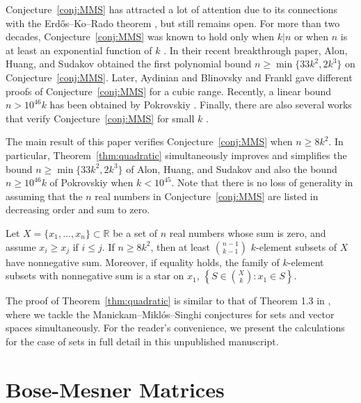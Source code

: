 \documentclass[12pt]{article}
\theoremstyle{plain}
{\theorembodyfont{\slshape}
\newtheorem{theorem}{Theorem}[section]
\newtheorem{lemma}[theorem]{Lemma}
\newtheorem{corollary}[theorem]{Corollary}}
\newcommand\tref[1]{Theorem~\ref{thm:#1}}
\newcommand\conjref[1]{Conjecture~\ref{conj:#1}}
\begin{document}
\conjref{MMS} has attracted a lot of attention due to its connections with the Erd\H{o}s--Ko--Rado theorem \cite{AAH, ahs, aydblin, bhatt, bier, biermanickam, blini, chowdhury, CSS, frankl, HS, HuangSudakov, manickam, mm, ms, MC, Pokrovskiy, Tyomkyn}, but still remains open. For more than two decades, \conjref{MMS} was known to hold only when $k|n$ \cite{ms} or when $n$ is at least an exponential function of $k$ \cite{bhatt, biermanickam, mm, Tyomkyn}. In their recent breakthrough paper, Alon, Huang, and Sudakov \cite{ahs} obtained the first polynomial bound $n \geq \min\{33k^{2}, 2k^{3}\}$ on \conjref{MMS}. Later, Aydinian and Blinovsky \cite{aydblin} and Frankl \cite{frankl} gave different proofs of \conjref{MMS} for a cubic range. Recently, a linear bound $n > 10^{46}k$ has been obtained by Pokrovskiy \cite{Pokrovskiy}. Finally, there are also several works that verify \conjref{MMS} for small $k$ \cite{chowdhury, HS, manickam, MC}.

The main result of this paper verifies \conjref{MMS} when $n \geq 8k^{2}$. In particular, \tref{quadratic} simultaneously improves and simplifies the bound $n \geq \min\{33k^{2}, 2k^{3} \}$ of Alon, Huang, and Sudakov \cite{ahs} and also the bound $n \geq 10^{46}k$ of Pokrovskiy \cite{Pokrovskiy} when $k < 10^{45}$. Note that there is no loss of generality in assuming that the $n$ real numbers in \conjref{MMS} are listed in decreasing order and sum to zero.

\begin{theorem}
\label{thm:quadratic}
Let $X = \{x_{1}, \ldots, x_{n} \} \subset \mathbb{R}$ be a set of $n$ real numbers whose sum is zero, and assume $x_{i} \geq x_{j}$ if $i \leq j$. If $n \geq 8k^{2}$, then at least $\binom{n-1}{k-1}$ $k$-element subsets of $X$ have nonnegative sum. Moreover, if equality holds, the family of $k$-element subsets with nonnegative sum is a star on $x_{1}$, $\left \{S \in \binom{X}{k} : x_{1} \in S \right \}$.
\end{theorem}

The proof of \tref{quadratic} is similar to that of Theorem 1.3 in \cite{CSS}, where we tackle the Manickam--Mikl\'{o}s--Singhi conjectures for sets and vector spaces simultaneously. For the reader's convenience, we present the calculations for the case of sets in full detail in this unpublished manuscript.

\section{Bose-Mesner Matrices}
\label{sec:bosemesner}
\end{document}
